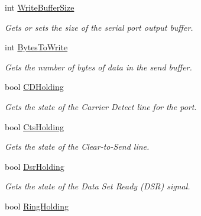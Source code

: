 \begin{DoxyCompactItemize}
int \mbox{\hyperlink{class_r_j_c_p_1_1_i_o_1_1_ports_1_1_serial_port_stream_a5348dc0afb09c8118d9f440e4d090d3e}{Write\+Buffer\+Size}}
\begin{DoxyCompactList}\small\item\em Gets or sets the size of the serial port output buffer. \end{DoxyCompactList}\item 
int \mbox{\hyperlink{class_r_j_c_p_1_1_i_o_1_1_ports_1_1_serial_port_stream_a46df89a1aaa129905494b3a9e3f9e2c3}{Bytes\+To\+Write}}
\begin{DoxyCompactList}\small\item\em Gets the number of bytes of data in the send buffer. \end{DoxyCompactList}\item 
bool \mbox{\hyperlink{class_r_j_c_p_1_1_i_o_1_1_ports_1_1_serial_port_stream_abc3f7b36bc4b10acfaea65d03356fc61}{C\+D\+Holding}}
\begin{DoxyCompactList}\small\item\em Gets the state of the Carrier Detect line for the port. \end{DoxyCompactList}\item 
bool \mbox{\hyperlink{class_r_j_c_p_1_1_i_o_1_1_ports_1_1_serial_port_stream_a63d7e47b92d9e4d2635c19f7025c8609}{Cts\+Holding}}
\begin{DoxyCompactList}\small\item\em Gets the state of the Clear-\/to-\/\+Send line. \end{DoxyCompactList}\item 
bool \mbox{\hyperlink{class_r_j_c_p_1_1_i_o_1_1_ports_1_1_serial_port_stream_ae0b63bbec7700825cc67c9a2d31d3649}{Dsr\+Holding}}
\begin{DoxyCompactList}\small\item\em Gets the state of the Data Set Ready (D\+SR) signal. \end{DoxyCompactList}\item 
bool \mbox{\hyperlink{class_r_j_c_p_1_1_i_o_1_1_ports_1_1_serial_port_stream_aadbfc89cfb7940fac498888e691c28e1}{Ring\+Holding}}

\end{DoxyCompactItemize}
